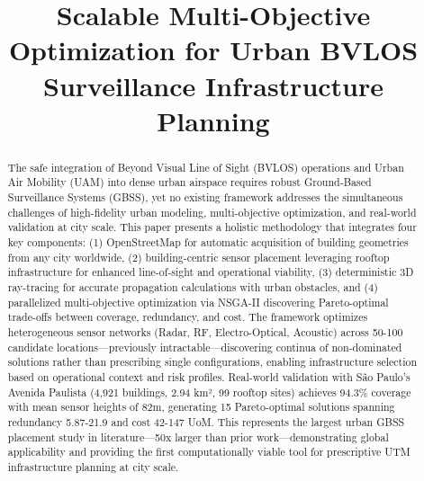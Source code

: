 \documentclass[conference]{IEEEtran}
\begin{document}
\title{Scalable Multi-Objective Optimization for Urban BVLOS Surveillance Infrastructure Planning}

\author{
}

\maketitle

\begin{abstract}
The safe integration of Beyond Visual Line of Sight (BVLOS) operations and Urban Air Mobility (UAM) into dense urban airspace requires robust Ground-Based Surveillance Systems (GBSS), yet no existing framework addresses the simultaneous challenges of high-fidelity urban modeling, multi-objective optimization, and real-world validation at city scale. This paper presents a holistic methodology that integrates four key components: (1) OpenStreetMap for automatic acquisition of building geometries from any city worldwide, (2) building-centric sensor placement leveraging rooftop infrastructure for enhanced line-of-sight and operational viability, (3) deterministic 3D ray-tracing for accurate propagation calculations with urban obstacles, and (4) parallelized multi-objective optimization via NSGA-II discovering Pareto-optimal trade-offs between coverage, redundancy, and cost. The framework optimizes heterogeneous sensor networks (Radar, RF, Electro-Optical, Acoustic) across 50-100 candidate locations—previously intractable—discovering continua of non-dominated solutions rather than prescribing single configurations, enabling infrastructure selection based on operational context and risk profiles. Real-world validation with São Paulo's Avenida Paulista (4,921 buildings, 2.94 km², 99 rooftop sites) achieves 94.3\% coverage with mean sensor heights of 82m, generating 15 Pareto-optimal solutions spanning redundancy 5.87-21.9 and cost 42-147 UoM. This represents the largest urban GBSS placement study in literature—50x larger than prior work—demonstrating global applicability and providing the first computationally viable tool for prescriptive UTM infrastructure planning at city scale.
\end{abstract}
\end{document}
